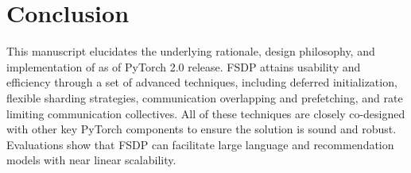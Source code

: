 \section{Conclusion}\label{sec:conclusion}

This manuscript elucidates the underlying rationale, design philosophy, and implementation of  as of PyTorch 2.0 release. FSDP attains usability and efficiency through a set of advanced techniques, including deferred initialization, flexible sharding strategies, communication overlapping and prefetching, and rate limiting communication collectives. All of these techniques are closely co-designed with other key PyTorch components to ensure the solution is sound and robust. Evaluations show that FSDP can facilitate large language and recommendation models with near linear scalability. 